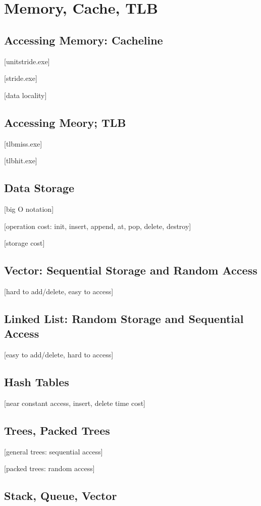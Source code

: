 \documentclass[main]{subfiles}
\begin{document}
\section{Memory, Cache, TLB}
\subsection{Accessing Memory: Cacheline}
[unitstride.exe]

[stride.exe]

[data locality]

\subsection{Accessing Meory; TLB}
[tlbmiss.exe]

[tlbhit.exe] 
\subsection{Data Storage}
[big O notation]

[operation cost: init, insert, append, at, pop, delete, destroy]

[storage cost]
\subsection{Vector: Sequential Storage and Random Access}
[hard to add/delete, easy to access]
\subsection{Linked List: Random Storage and Sequential Access}
[easy to add/delete, hard to access]
\subsection{Hash Tables}
[near constant access, insert, delete time cost]
\subsection{Trees, Packed Trees}
[general trees: sequential access]

[packed trees: random access]
\subsection{Stack, Queue, Vector}
\end{document}
